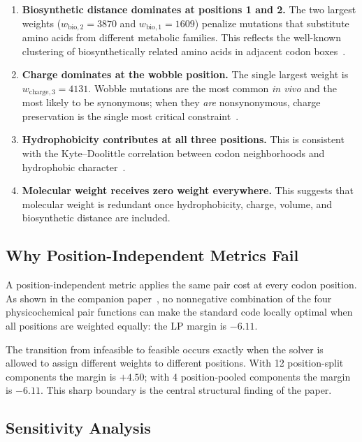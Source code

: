 \documentclass[11pt,twocolumn]{article}
\begin{document}
\begin{enumerate}
\item \textbf{Biosynthetic distance dominates at positions 1 and 2.}
  The two largest weights ($w_{\text{bio},2} = 3870$ and
  $w_{\text{bio},1} = 1609$) penalize mutations that substitute amino acids
  from different metabolic families. This reflects the well-known clustering
  of biosynthetically related amino acids in adjacent codon
  boxes~\cite{Wong1975}.

\item \textbf{Charge dominates at the wobble position.} The single largest
  weight is $w_{\text{charge},3} = 4131$. Wobble mutations are the most
  common \emph{in vivo} and the most likely to be synonymous; when they
  \emph{are} nonsynonymous, charge preservation is the single most
  critical constraint~\cite{Grantham1974}.

\item \textbf{Hydrophobicity contributes at all three positions.}
  This is consistent with the Kyte--Doolittle correlation between codon
  neighborhoods and hydrophobic character~\cite{Woese1966}.

\item \textbf{Molecular weight receives zero weight everywhere.} This
  suggests that molecular weight is redundant once hydrophobicity, charge,
  volume, and biosynthetic distance are included.
\end{enumerate}

\subsection{Why Position-Independent Metrics Fail}

A position-independent metric applies the same pair cost at every codon
position. As shown in the companion paper~\cite{Paper1}, no nonnegative
combination of the four physicochemical pair functions can make the
standard code locally optimal when all positions are weighted equally:
the LP margin is $-6.11$.

The transition from infeasible to feasible occurs exactly when the solver
is allowed to assign different weights to different positions. With 12
position-split components the margin is $+4.50$; with 4 position-pooled
components the margin is $-6.11$. This sharp boundary is the central
structural finding of the paper.

\subsection{Sensitivity Analysis}
\end{document}
